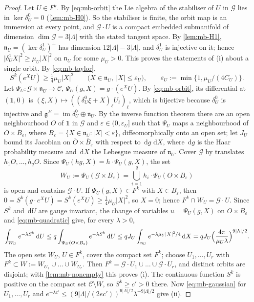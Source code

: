 \documentclass[11pt,a4paper]{amsart}
\theoremstyle{definition}
\theoremstyle{remark}
\numberwithin{equation}{section}
\newcommand{\abs}[1]{\lvert #1\rvert}      %
\newcommand{\dd}{\,\mathrm{d}}             %
\begin{document}
\begin{proof}
Let $U\in F^k$. By \eqref{eq:mb-orbit} the Lie algebra of the stabiliser of $U$ in $\mathcal G$ lies in $\ker\delta^0_U=0$ (\cref{lem:mb-H0}). So the stabiliser is finite, the orbit map is an immersion at every point, and $\mathcal G\cdot U$ is a compact embedded submanifold of dimension $\dim\mathcal G=3\abs\Lambda$ with the stated tangent space. By \cref{lem:mb-H1}, $\mathfrak n_U=(\ker\delta^1_U)^\perp$ has dimension $12\abs\Lambda-3\abs\Lambda$, and $\delta^1_U$ is injective on it; hence $\abs{\delta^1_UX}^2\ge\mu_U\abs X^2$ on $\mathfrak n_U$ for some $\mu_U>0$. This proves the statements of (i) about a single orbit. By \eqref{eq:mb-taylor},
\begin{equation}\label{eq:mb-quadratic}
S^k(e^XU)\ge\tfrac14\mu_U\abs X^2\qquad\bigl(X\in\mathfrak n_U,\ \abs X\le\varepsilon_U\bigr),\qquad\varepsilon_U:=\min\{1,\mu_U/(4C_U)\}.
\end{equation}
Let $\Psi_U\colon\mathcal G\times\mathfrak n_U\to\mathcal C$, $\Psi_U(g,X)=g\cdot(e^XU)$. By \eqref{eq:mb-orbit}, its differential at $(\mathbf 1,0)$ is $(\xi,X)\mapsto((\delta^0_U\xi+X)_\ell U_\ell)_\ell$, which is bijective because $\delta^0_U$ is injective and $\mathfrak g^E=\operatorname{im}\delta^0_U\oplus\mathfrak n_U$. By the inverse function theorem there are an open neighbourhood $O$ of $\mathbf 1$ in $\mathcal G$ and $\varepsilon\in(0,\varepsilon_U]$ such that $\Psi_U$ maps a neighbourhood of $\bar O\times\bar B_\varepsilon$, where $B_\varepsilon=\{X\in\mathfrak n_U:\abs X<\varepsilon\}$, diffeomorphically onto an open set; let $J_U$ bound its Jacobian on $\bar O\times\bar B_\varepsilon$ with respect to $\dd g\,\dd X$, where $\dd g$ is the Haar probability measure and $\dd X$ the Lebesgue measure of $\mathfrak n_U$. Cover $\mathcal G$ by translates $h_1O,\dots,h_qO$. Since $\Psi_U(hg,X)=h\cdot\Psi_U(g,X)$, the set
\[
W_U:=\Psi_U(\mathcal G\times B_\varepsilon)=\bigcup_{i=1}^qh_i\cdot\Psi_U(O\times B_\varepsilon)
\]
is open and contains $\mathcal G\cdot U$. If $\Psi_U(g,X)\in F^k$ with $X\in B_\varepsilon$, then $0=S^k(g\cdot e^XU)=S^k(e^XU)\ge\frac14\mu_U\abs X^2$, so $X=0$; hence $F^k\cap W_U=\mathcal G\cdot U$. Since $S^k$ and $\dd U$ are gauge invariant, the change of variables $u=\Psi_U(g,X)$ on $O\times B_\varepsilon$ and \eqref{eq:mb-quadratic} give, for every $\lambda>0$,
\begin{equation}\label{eq:mb-gaussian}
\int_{W_U}e^{-\lambda S^k}\dd U\le q\int_{\Psi_U(O\times B_\varepsilon)}e^{-\lambda S^k}\dd U\le qJ_U\int_{\mathfrak n_U}e^{-\lambda\mu_U\abs X^2/4}\dd X=qJ_U\Bigl(\frac{4\pi}{\mu_U\lambda}\Bigr)^{9\abs\Lambda/2}.
\end{equation}
The open sets $W_U$, $U\in F^k$, cover the compact set $F^k$; choose $U_1,\dots,U_r$ with $F^k\subset W:=W_{U_1}\cup\dots\cup W_{U_r}$. Then $F^k=\mathcal G\cdot U_1\cup\dots\cup\mathcal G\cdot U_r$, and distinct orbits are disjoint; with \cref{lem:mb-nonempty} this proves (i). The continuous function $S^k$ is positive on the compact set $\mathcal C\setminus W$, so $S^k\ge c'>0$ there. Now \eqref{eq:mb-gaussian} for $U_1,\dots,U_r$ and $e^{-\lambda c'}\le(9\abs\Lambda/(2ec'))^{9\abs\Lambda/2}\lambda^{-9\abs\Lambda/2}$ give (ii).
\end{proof}
\end{document}
